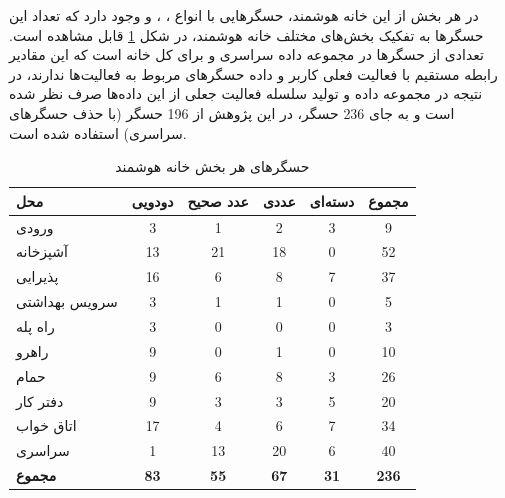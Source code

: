 در هر بخش از این خانه هوشمند، حسگرهایی با انواع ، ،  و  وجود دارد که تعداد این حسگرها به تفکیک بخش‌های مختلف خانه هوشمند، در شکل \ref{tab:tO4H1} قابل مشاهده است. تعدادی از حسگرها در مجموعه داده  سراسری و برای کل خانه است که این مقادیر رابطه مستقیم با فعالیت فعلی کاربر و داده حسگرهای مربوط به فعالیت‌ها ندارند، در نتیجه در مجموعه داده و تولید سلسله فعالیت جعلی از این داده‌ها صرف نظر شده است و به جای 236 حسگر، در این پژوهش از 196 حسگر (با حذف حسگرهای سراسری) استفاده شده است.

\begin{table} [htp]
 \centering
 \caption{حسگرهای هر بخش خانه هوشمند}
 \label{tab:tO4H1}
 \begin{adjustbox}{width=0.8\textwidth}
\begin{tabular}{|l|c|c|c|c|c|}
\hline
\textbf{محل} & \textbf{دودویی} & \textbf{عدد صحیح} & \textbf{عددی} & \textbf{دسته‌ای} & \textbf{مجموع} \\ \hline
ورودی       & 3               & 1                & 2                    & 3                    & 9             \\ \hline
آشپزخانه        & 13              & 21               & 18                   & 0                    & 52            \\ \hline
پذیرایی    & 16              & 6                & 8                    & 7                    & 37            \\ \hline
سرویس بهداشتی         & 3               & 1                & 1                    & 0                    & 5             \\ \hline
راه پله      & 3               & 0                & 0                    & 0                    & 3             \\ \hline
راهرو        & 9               & 0                & 1                    & 0                    & 10            \\ \hline
حمام       & 9               & 6                & 8                    & 3                    & 26            \\ \hline
دفتر کار         & 9               & 3                & 3                    & 5                    & 20            \\ \hline
اتاق خواب        & 17              & 4                & 6                    & 7                    & 34            \\ \hline
سراسری         & 1               & 13               & 20                   & 6                    & 40            \\ \hline
\textbf{مجموع} & \textbf{83}     & \textbf{55}      & \textbf{67}          & \textbf{31}          & \textbf{236}  \\ \hline
\end{tabular}
\end{adjustbox}
\end{table}

